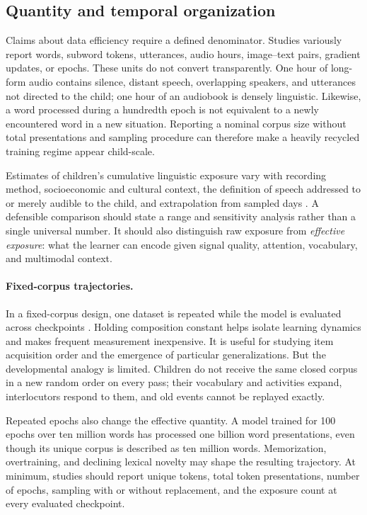 \subsection{Quantity and temporal organization}
\label{sec:litreview:input-quantity}

Claims about data efficiency require a defined denominator. Studies variously report words, subword tokens, utterances, audio hours, image--text pairs, gradient updates, or epochs. These units do not convert transparently. One hour of long-form audio contains silence, distant speech, overlapping speakers, and utterances not directed to the child; one hour of an audiobook is densely linguistic. Likewise, a word processed during a hundredth epoch is not equivalent to a newly encountered word in a new situation. Reporting a nominal corpus size without total presentations and sampling procedure can therefore make a heavily recycled training regime appear child-scale.

Estimates of children's cumulative linguistic exposure vary with recording method, socioeconomic and cultural context, the definition of speech addressed to or merely audible to the child, and extrapolation from sampled days \citep{hart1992american,WeislederFernald2013,frank2023baby}. A defensible comparison should state a range and sensitivity analysis rather than a single universal number. It should also distinguish raw exposure from \emph{effective exposure}: what the learner can encode given signal quality, attention, vocabulary, and multimodal context.

\paragraph{Fixed-corpus trajectories.}
In a fixed-corpus design, one dataset is repeated while the model is evaluated across checkpoints \citep{chang2022word,evanson2023language}. Holding composition constant helps isolate learning dynamics and makes frequent measurement inexpensive. It is useful for studying item acquisition order and the emergence of particular generalizations. But the developmental analogy is limited. Children do not receive the same closed corpus in a new random order on every pass; their vocabulary and activities expand, interlocutors respond to them, and old events cannot be replayed exactly.

Repeated epochs also change the effective quantity. A model trained for 100 epochs over ten million words has processed one billion word presentations, even though its unique corpus is described as ten million words. Memorization, overtraining, and declining lexical novelty may shape the resulting trajectory. At minimum, studies should report unique tokens, total token presentations, number of epochs, sampling with or without replacement, and the exposure count at every evaluated checkpoint.


